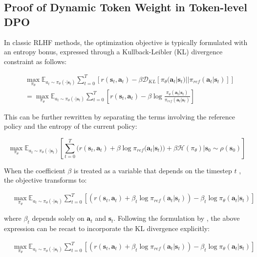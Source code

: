 \subsection{Proof of Dynamic Token Weight in Token-level DPO}
\label{app: change_beta}

In classic RLHF methods, the optimization objective is typically formulated with an entropy bonus, expressed through a Kullback-Leibler (KL) divergence constraint as follows:

\begin{align}
&
\max_{\pi_\theta} \mathbb{E}_{a_t \sim \pi_\theta(\cdot | \mathbf{s}_t)} \sum_{t=0}^{T} [r(\mathbf{s}_t, \mathbf{a}_t) - \beta \mathcal{D}_{KL}[\pi_{\theta}(\mathbf{a}_t | \mathbf{s}_t)||\pi_{ref}(\mathbf{a}_t | \mathbf{s}_t)]]
\\
&
=\max_{\pi_\theta} \mathbb{E}_{a_t \sim \pi_\theta(\cdot | \mathbf{s}_t)} \sum_{t=0}^{T} [r(\mathbf{s}_t, \mathbf{a}_t) - \beta \log \frac{\pi_{\theta}(\mathbf{a}_t | \mathbf{s}_t)}{\pi_{ref}(\mathbf{a}_t | \mathbf{s}_t)}]
\label{eq: rlhf_objective}
\end{align}

This can be further rewritten by separating the terms involving the reference policy and the entropy of the current policy:

$$\max_{\pi_\theta} \mathbb{E}_{a_t \sim \pi_\theta(\cdot | \mathbf{s}_t)} [ \sum_{t=0}^{T} ( r(\mathbf{s}_t, \mathbf{a}_t) + \beta \log \pi_{ref}(\mathbf{a}_t | \mathbf{s}_t) ) + \beta \mathcal{H}(\pi_\theta) | \mathbf{s}_0 \sim \rho(\mathbf{s}_0) ]$$

When the coefficient $\beta$ is treated as a variable that depends on the timestep $t$ \cite{li20242ddposcalingdirectpreference}, the objective transforms to:

\begin{align}
&
\max_{\pi_\theta} \mathbb{E}_{a_t \sim \pi_\theta(\cdot | \mathbf{s}_t)} \sum_{t=0}^{T} [( r(\mathbf{s}_t, \mathbf{a}_t) + \beta_t \log \pi_{ref}(\mathbf{a}_t | \mathbf{s}_t)) - \beta_t \log \pi_{\theta}(\mathbf{a}_t | \mathbf{s}_t)]
\end{align}

\noindent where $\beta_t$ depends solely on $\mathbf{a}_t$ and $\mathbf{s}_t$. Following the formulation by \citet{Levine2018ReinforcementLA}, the above expression can be recast to incorporate the KL divergence explicitly:

\begin{align}
&
\max_{\pi_\theta} \mathbb{E}_{a_t \sim \pi_\theta(\cdot | \mathbf{s}_t)} \sum_{t=0}^{T} [( r(\mathbf{s}_t, \mathbf{a}_t) + \beta_t \log \pi_{ref}(\mathbf{a}_t | \mathbf{s}_t)) - \beta_t \log \pi_{\theta}(\mathbf{a}_t | \mathbf{s}_t)]
\end{align}

